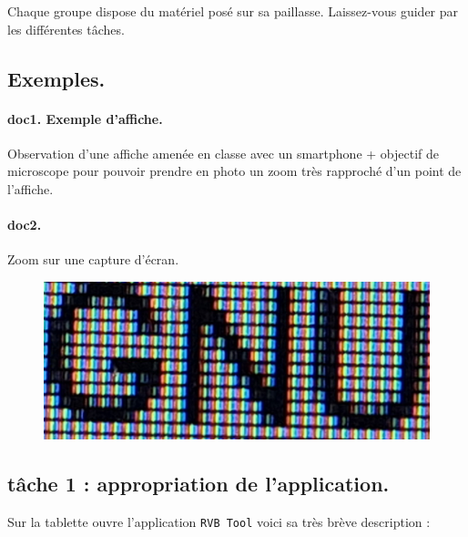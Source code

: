 \documentclass[12pt,a4paper,notitlepage]{article}
\begin{document}
Chaque groupe dispose du matériel posé sur sa paillasse. 
Laissez-vous guider par les différentes tâches.

\subsection*{Exemples.}
\paragraph*{doc1. Exemple d'affiche.}
Observation d'une affiche amenée en classe avec un smartphone + objectif de microscope pour pouvoir prendre en photo un zoom très rapproché d'un point de l'affiche.

\paragraph*{doc2.} Zoom sur une capture d'écran.
\begin{figure}
	\centering
	\includegraphics{gnu.jpg}
\end{figure}

\subsection*{tâche 1 : appropriation de l'application.}
Sur la tablette ouvre l'application \texttt{RVB Tool} voici sa très brève description :
\end{document}
